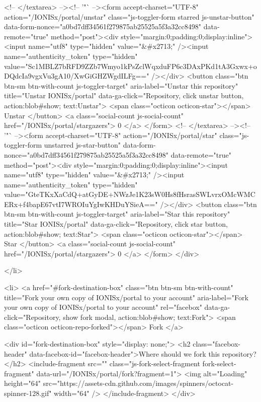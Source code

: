     <!-- </textarea> --><!-- '"` --><form accept-charset="UTF-8" action="/IONISx/portal/unstar" class="js-toggler-form starred js-unstar-button" data-form-nonce="a0bd7dff34561f279875ab25525a5f3a32cc8498" data-remote="true" method="post"><div style="margin:0;padding:0;display:inline"><input name="utf8" type="hidden" value="&#x2713;" /><input name="authenticity_token" type="hidden" value="Sc1MBLZ7bRFD9ZZb7Wmyo1kPsZclWqxduFP6c3DAxPKd1tA3Gxwx+oDQdcIa9vgxVu3gA10/XwGiGHZWgdILFg==" /></div>
      <button
        class="btn btn-sm btn-with-count js-toggler-target"
        aria-label="Unstar this repository" title="Unstar IONISx/portal"
        data-ga-click="Repository, click unstar button, action:blob#show; text:Unstar">
        <span class="octicon octicon-star"></span>
        Unstar
      </button>
        <a class="social-count js-social-count" href="/IONISx/portal/stargazers">
          0
        </a>
</form>
    <!-- </textarea> --><!-- '"` --><form accept-charset="UTF-8" action="/IONISx/portal/star" class="js-toggler-form unstarred js-star-button" data-form-nonce="a0bd7dff34561f279875ab25525a5f3a32cc8498" data-remote="true" method="post"><div style="margin:0;padding:0;display:inline"><input name="utf8" type="hidden" value="&#x2713;" /><input name="authenticity_token" type="hidden" value="GteTKxXaCdQ+atGyDE+NWzJe1K23sW0Hs8fHsrasSWLvrxOMcWMCERx+f4bapE67vtI7WROIuYgIwKHDuYSieA==" /></div>
      <button
        class="btn btn-sm btn-with-count js-toggler-target"
        aria-label="Star this repository" title="Star IONISx/portal"
        data-ga-click="Repository, click star button, action:blob#show; text:Star">
        <span class="octicon octicon-star"></span>
        Star
      </button>
        <a class="social-count js-social-count" href="/IONISx/portal/stargazers">
          0
        </a>
</form>  </div>

  </li>

  <li>
          <a href="#fork-destination-box" class="btn btn-sm btn-with-count"
              title="Fork your own copy of IONISx/portal to your account"
              aria-label="Fork your own copy of IONISx/portal to your account"
              rel="facebox"
              data-ga-click="Repository, show fork modal, action:blob#show; text:Fork">
            <span class="octicon octicon-repo-forked"></span>
            Fork
          </a>

          <div id="fork-destination-box" style="display: none;">
            <h2 class="facebox-header" data-facebox-id="facebox-header">Where should we fork this repository?</h2>
            <include-fragment src=""
                class="js-fork-select-fragment fork-select-fragment"
                data-url="/IONISx/portal/fork?fragment=1">
              <img alt="Loading" height="64" src="https://assets-cdn.github.com/images/spinners/octocat-spinner-128.gif" width="64" />
            </include-fragment>
          </div>

